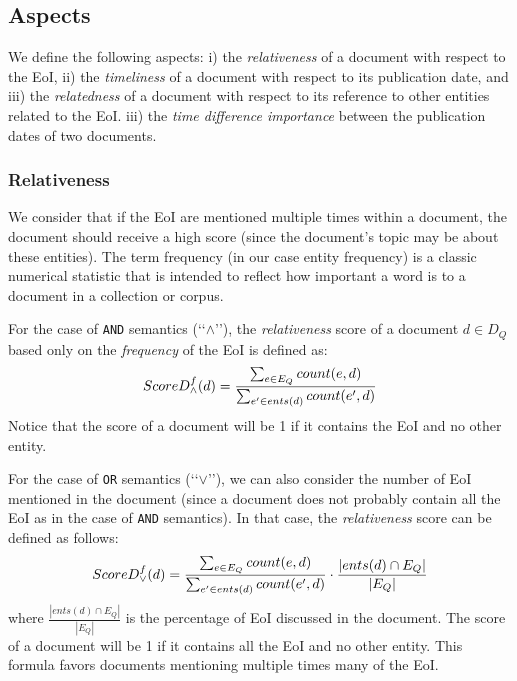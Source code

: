 \documentclass{article}
\newcommand{\q}[1]{\lq\lq{}{}#1\rq\rq{}{}}
\begin{document}
\subsection{Aspects}

We define the following aspects:
i) the {\em relativeness} of a document with respect to the EoI,
ii) the {\em timeliness} of a document with respect to its publication date, and
iii) the {\em relatedness} of a document with respect to its reference to other entities related to the EoI.
iii) the {\em time difference importance} between the publication dates of two documents.

\subsubsection*{Relativeness}

We consider that if the EoI are mentioned multiple times
within a document, the document should receive a high score
(since the document's topic may be about these entities).
The term frequency (in our case entity frequency) is a classic numerical statistic
that is intended to reflect how important
a word is to a document in a collection or corpus.

For the case of {\tt AND} semantics (\q{$\wedge$}),
the {\em relativeness} score of a document $d \in D_Q$ based only on the {\em frequency} of the EoI
is defined as:
\begin{equation}
\small
ScoreD^{f}_{\wedge}(d) = \frac{\sum_{e \in E_Q}{count(e, d)}}{\sum_{e' \in ents(d)}{count(e', d)}}
\end{equation}
Notice that the score of a document will be 1 if it contains the EoI and no other entity.

For the case of {\tt OR} semantics (\q{$\vee$}),
we can also consider the number of EoI mentioned in the document
(since a document does not probably contain all the EoI as in the case of {\tt AND} semantics).
In that case, the {\em relativeness} score can be defined as follows:
\begin{equation}
\small
ScoreD^{f}_{\vee}(d) = \frac{\sum_{e \in E_Q}{count(e, d)}}{\sum_{e' \in ents(d)}{count(e', d)}} \cdot \frac{|ents(d) \cap E_Q|}{|E_Q|}
\end{equation}
where $\frac{|ents(d) \cap E_Q|}{|E_Q|}$ is the percentage of EoI discussed in the document.
The score of a document will be 1 if it contains all the EoI and no other entity.
This formula favors documents mentioning multiple times many of the EoI.
\end{document}
